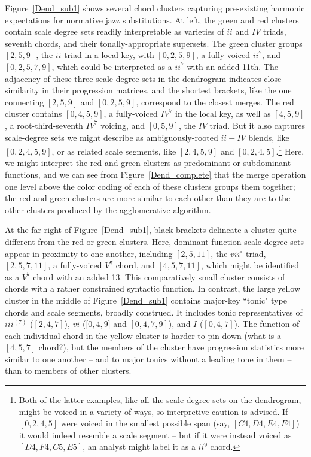 
Figure~\ref{Dend_sub1} shows several chord clusters capturing pre-existing harmonic expectations for normative jazz substitutions.  At left, the green and red clusters contain scale degree sets readily interpretable as varieties of $ii$ and $IV$ triads, seventh chords, and their tonally-appropriate supersets.  The green cluster groups $[2,5,9]$, the $ii$ triad in a local key, with $[0,2,5,9]$, a fully-voiced $ii^7$, and $[0,2,5,7,9]$, which could be interpreted as a $ii^{7}$ with an added 11th.  The adjacency of these three scale degree sets in the dendrogram indicates close similarity in their progression matrices, and the shortest brackets, like the one connecting $[2,5,9]$ and $[0,2,5,9]$, correspond to the closest merges.  The red cluster contains $[0,4,5,9]$, a fully-voiced $IV^7$ in the local key, as well as $[4,5,9]$, a root-third-seventh $IV^7$ voicing, and $[0,5,9]$, the $IV$ triad.  But it also captures scale-degree sets we might describe as ambiguously-rooted $ii-IV$ blends, like $[0,2,4,5,9]$, or as related scale segments, like $[2,4,5,9]$ and $[0,2,4,5]$.\footnote{Both of the latter examples, like all the scale-degree sets on the dendrogram, might be voiced in a variety of ways, so interpretive caution is advised.  If $[0,2,4,5]$ were voiced in the smallest possible span (say, $[C4,D4,E4,F4]$) it would indeed resemble a scale segment -- but if it were instead voiced as $[D4,F4,C5,E5]$, an analyst might label it as a $ii^9$ chord.}   Here, we might interpret the red and green clusters as predominant or subdominant functions, and we can see from Figure~\ref{Dend_complete} that the merge operation one level above the color coding of each of these clusters groups them together; the red and green clusters are more similar to each other than they are to the other clusters produced by the agglomerative algorithm.

At the far right of Figure~\ref{Dend_sub1}, black brackets delineate a cluster quite different from the red or green clusters.  Here, dominant-function scale-degree sets appear in proximity to one another, including $[2,5,11]$, the $vii^{\circ}$ triad, $[2,5,7,11]$, a fully-voiced $V^7$ chord, and $[4,5,7,11]$, which might be identified as a $V^7$ chord with an added 13.  This comparatively small cluster consists of chords with a rather constrained syntactic function.  In contrast, the large yellow cluster in the middle of Figure~\ref{Dend_sub1} contains major-key ``tonic" type chords and scale segments, broadly construed.  It includes tonic representatives of $iii^{(7)}$ ($[2,4,7]$), $vi$ ([$0,4,9]$ and $[0,4,7,9]$), and $I$ ($[0,4,7]$).  The function of each individual chord in the yellow cluster is harder to pin down (what is a $[4,5,7]$ chord?), but the members of the cluster have progression statistics more similar to one another -- and to major tonics without a leading tone in them -- than to members of other clusters.

